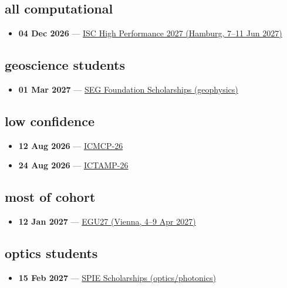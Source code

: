 \subsection*{all computational}
\begin{itemize}[leftmargin=1.4em,itemsep=0.1em]
  \item \textbf{04 Dec 2026} --- \href{https://isc-hpc.com/}{ISC High Performance 2027 (Hamburg, 7--11 Jun 2027)}
\end{itemize}

\subsection*{geoscience students}
\begin{itemize}[leftmargin=1.4em,itemsep=0.1em]
  \item \textbf{01 Mar 2027} --- \href{https://seg.org/programs/student-programs/scholarships/}{SEG Foundation Scholarships (geophysics)}
\end{itemize}

\subsection*{low confidence}
\begin{itemize}[leftmargin=1.4em,itemsep=0.1em]
  \item \textbf{12 Aug 2026} --- \href{https://apste.net/conf/about-event.php?id=101299816}{ICMCP-26}
  \item \textbf{24 Aug 2026} --- \href{https://researchleagues.com/event/index.php?id=101136329}{ICTAMP-26}
\end{itemize}

\subsection*{most of cohort}
\begin{itemize}[leftmargin=1.4em,itemsep=0.1em]
  \item \textbf{12 Jan 2027} --- \href{https://www.egu27.eu/}{EGU27 (Vienna, 4--9 Apr 2027)}
\end{itemize}

\subsection*{optics students}
\begin{itemize}[leftmargin=1.4em,itemsep=0.1em]
  \item \textbf{15 Feb 2027} --- \href{https://spie.org/membership/student-hub/scholarships/optics-and-photonics-education-scholarships}{SPIE Scholarships (optics/photonics)}
\end{itemize}

